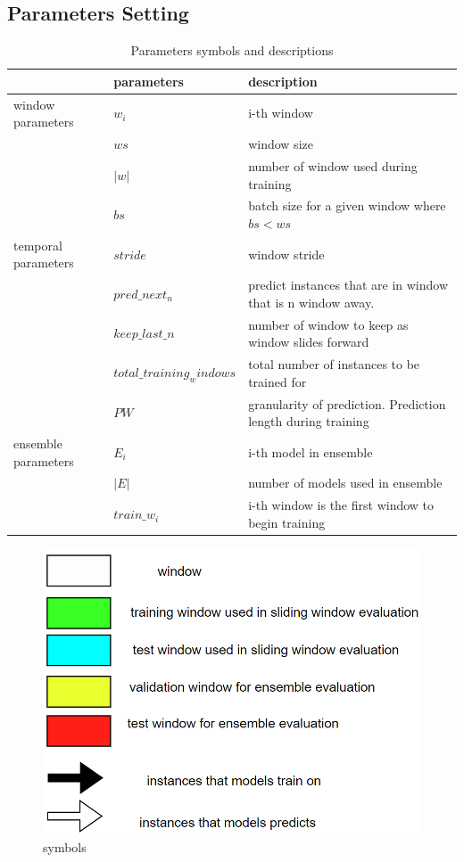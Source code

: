 \documentclass{IEEEtran}
\begin{document}
\subsection{Parameters Setting}
\label{sec:org699772a}
\begin{table}[htbp]
\caption{\label{parameters}Parameters symbols and descriptions}
\centering
\begin{tabular}{lll}
\hline
\hline
 & parameters & description\\
\hline
window parameters & \(w_i\) & i-th window\\
 & \(ws\) & window size\\
 & \(\vert w \vert\) & number of window used during training\\
 & \(bs\) & batch size for a given window where \(bs < ws\)\\
temporal parameters & \(stride\) & window stride\\
 & \(pred\_next_{n}\) & predict instances that are in window that is n window away.\\
 & \(keep\_last\_n\) & number of window to keep as window slides forward\\
 & \(total\_training_windows\) & total number of instances to be trained for\\
 & \(PW\) & granularity of prediction. Prediction length during training\\
ensemble parameters & \(E_i\) & i-th model in ensemble\\
 & \(\vert E \vert\) & number of models used in ensemble\\
 & \(train\_w_{i}\) & i-th window is the first window to begin training\\
\end{tabular}
\end{table}

\begin{figure}[htbp]
\centering
\includegraphics[width=.9\linewidth]{./images/screenshot_20220321_130824.png}
\caption{\label{symbols}symbols}
\end{figure}
\end{document}
